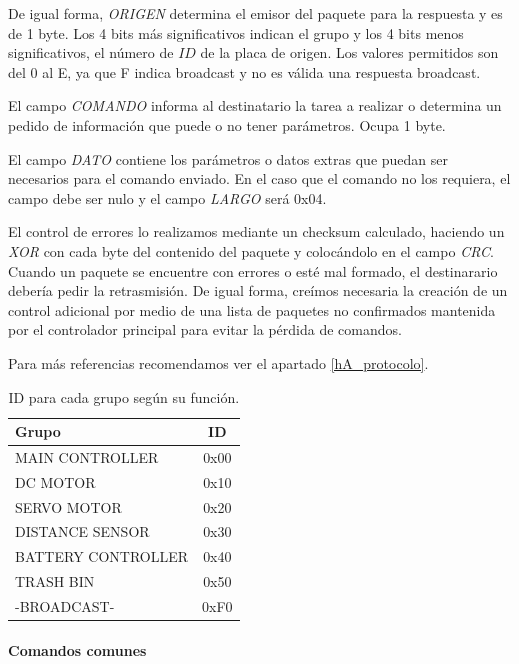 De igual forma, \emph{ORIGEN} determina el emisor del paquete para la respuesta y es de 1 byte.
Los 4 bits m\'as significativos indican el grupo y los 4 bits menos significativos, el n\'umero de $ID$ de la placa de origen.
Los valores permitidos son del $0$ al E, ya que F indica broadcast y no es v\'alida una respuesta broadcast.

El campo \emph{COMANDO} informa al destinatario la tarea a realizar o determina un pedido de informaci\'on que puede o no
tener par\'ametros.
Ocupa 1 byte.

El campo \emph{DATO} contiene los par\'ametros o datos extras que puedan ser necesarios para el comando enviado.
En el caso que el comando no los requiera, el campo debe ser nulo y el campo \emph{LARGO} ser\'a 0x04.

El control de errores lo realizamos mediante un checksum calculado, haciendo un \emph{XOR} con cada byte del contenido del paquete
y coloc\'andolo en el campo \emph{CRC}.
Cuando un paquete se encuentre con errores o est\'e mal formado, el destinarario deber\'ia pedir la retrasmisi\'on.
De igual forma, cre\'imos necesaria la creaci\'on de un control adicional por medio de una lista de paquetes no confirmados mantenida
por el controlador principal para evitar la p\'erdida de comandos.

Para m\'as referencias recomendamos ver el apartado \ref{hA_protocolo}.

\begin{table}[h]
	\begin{center}
		\begin{tabular}{|l|c|}
			\hline
			Grupo & ID \\
			\hline
			MAIN CONTROLLER & 0x00 \\
			\hline
			DC MOTOR & 0x10 \\
			\hline
			SERVO MOTOR & 0x20 \\
			\hline
			DISTANCE SENSOR & 0x30 \\
			\hline
			BATTERY CONTROLLER & 0x40 \\
			\hline
			TRASH BIN & 0x50 \\
			\hline
			-BROADCAST- & 0xF0 \\
			\hline
		\end{tabular}
		\caption{ID para cada grupo seg\'un su funci\'on.}
		\label{hT_comm_protocolo_grupos}
	\end{center}
\end{table}

\paragraph{Comandos comunes}
\label{h_comm_protocolo_comandosComunes}

